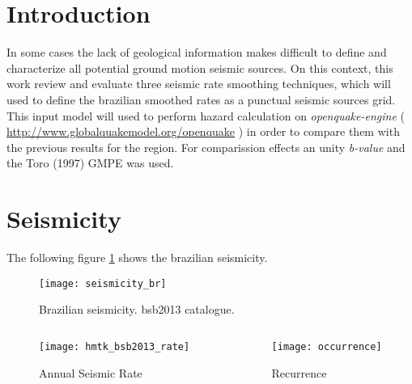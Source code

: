 \documentclass[final]{beamer}
\author{Marlon Pirchiner$^{1,2}$\\
\vspace{0.2cm} \scriptsize \alert{\url{marlon@iag.usp.br}} }
\institute{
$^1$Seismological Centre, IAG-USP,\\
$^2$Applied Math School, EMAp-FGV-RJ
}
\begin{document}
\begin{poster}


\newcolumn


\section{Introduction}
\footnotesize
In some cases the lack of geological information makes difficult to define and
characterize all potential ground motion seismic sources. On this context, 
this work review and evaluate three seismic rate smoothing techniques,
which will used to define the brazilian smoothed rates as a punctual seismic
sources grid. This input model will used to perform hazard calculation on
\emph{\alert{openquake-engine}}
(\scriptsize
 \url{http://www.globalquakemodel.org/openquake}
 \footnotesize) 
in order to compare them with the previous results for the region. 
For comparission effects an unity \emph{b-value} and the Toro (1997) GMPE was
used.

\section{Seismicity}
\footnotesize
The following figure \ref{fig:br_seis} shows the brazilian seismicity.
\begin{figure}[H]
	\scriptsize
	\centering
	\texttt{[image: seismicity\_br]} 
	\caption{Brazilian seismicity. \gls{bsb2013} catalogue.}
	\label{fig:br_seis} 
\end{figure}

\begin{columns}
	\begin{column}[T]{0.50\textwidth}
		\centering
		\begin{figure}[H]
		  	\centering
			\texttt{[image: hmtk\_bsb2013\_rate]}
			\caption{Annual Seismic Rate}
			\label{fig:sa_eq_record}
		\end{figure}
	\end{column}

	\begin{column}[T]{0.48\textwidth}
		\centering
		\begin{figure}[H]
		  	\centering
			\texttt{[image: occurrence]}
			\caption{Recurrence}
			\label{fig:br_eq_record}
	    \end{figure}
	\end{column}
\end{columns}


\end{poster}
\end{document}
